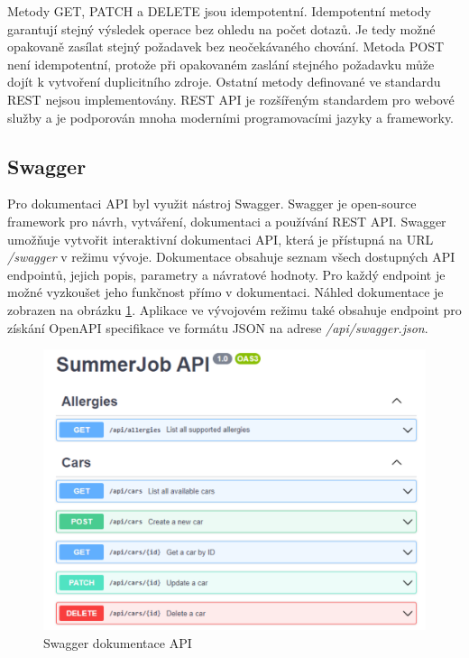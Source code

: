 Metody GET, PATCH a DELETE jsou idempotentní. Idempotentní metody garantují stejný výsledek operace bez ohledu na počet dotazů. Je tedy možné opakovaně
zasílat stejný požadavek bez neočekávaného chování. Metoda POST není idempotentní, protože při opakovaném zaslání stejného požadavku může dojít k vytvoření duplicitního zdroje. 
Ostatní metody definované ve standardu REST nejsou implementovány. REST API je rozšířeným standardem pro webové služby a je podporován mnoha moderními programovacími jazyky a frameworky.

\subsection{Swagger}

Pro dokumentaci API byl využit nástroj Swagger. Swagger je open-source framework pro návrh, vytváření, dokumentaci a používání REST API.
Swagger umožňuje vytvořit interaktivní dokumentaci API, která je přístupná na URL \textit{/swagger} v režimu vývoje. Dokumentace obsahuje seznam všech dostupných
API endpointů, jejich popis, parametry a návratové hodnoty. Pro každý endpoint je možné vyzkoušet jeho funkčnost přímo v dokumentaci.
Náhled dokumentace je zobrazen na obrázku \ref{fig:swagger}.
Aplikace ve vývojovém režimu také obsahuje endpoint pro získání OpenAPI specifikace ve formátu JSON na adrese \textit{/api/swagger.json}.

\begin{figure}[h]
    \centering
    \includegraphics[width=1\textwidth]{chapters/images/swagger.pdf}
    \caption{Swagger dokumentace API}
    \label{fig:swagger}
\end{figure}

